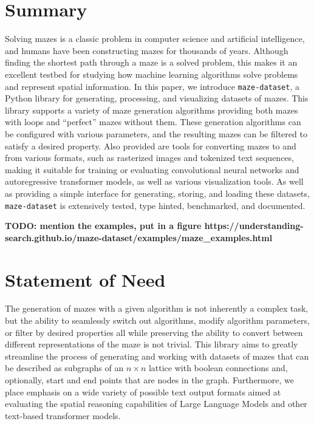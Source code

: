 \documentclass[10pt,a4paper,onecolumn]{article}
\begin{document}
\hypertarget{summary}{%
\section{Summary}\label{summary}}

Solving mazes is a classic problem in computer science and artificial
intelligence, and humans have been constructing mazes for thousands of
years. Although finding the shortest path through a maze is a solved
problem, this makes it an excellent testbed for studying how machine
learning algorithms solve problems and represent spatial information. In
this paper, we introduce \texttt{maze-dataset}, a Python library for
generating, processing, and visualizing datasets of mazes. This library
supports a variety of maze generation algorithms providing both mazes
with loops and ``perfect'' mazes without them. These generation
algorithms can be configured with various parameters, and the resulting
mazes can be filtered to satisfy a desired property. Also provided are
tools for converting mazes to and from various formats, such as
rasterized images and tokenized text sequences, making it suitable for
training or evaluating convolutional neural networks and autoregressive
transformer models, as well as various visualization tools. As well as
providing a simple interface for generating, storing, and loading these
datasets, \texttt{maze-dataset} is extensively tested, type hinted,
benchmarked, and documented.

\textbf{TODO: mention the examples, put in a figure
https://understanding-search.github.io/maze-dataset/examples/maze\_examples.html}

\hypertarget{statement-of-need}{%
\section{Statement of Need}\label{statement-of-need}}

The generation of mazes with a given algorithm is not inherently a
complex task, but the ability to seamlessly switch out algorithms,
modify algorithm parameters, or filter by desired properties all while
preserving the ability to convert between different representations of
the maze is not trivial. This library aims to greatly streamline the
process of generating and working with datasets of mazes that can be
described as subgraphs of an \(n \times n\) lattice with boolean
connections and, optionally, start and end points that are nodes in the
graph. Furthermore, we place emphasis on a wide variety of possible text
output formats aimed at evaluating the spatial reasoning capabilities of
Large Language Models and other text-based transformer models.
\end{document}
